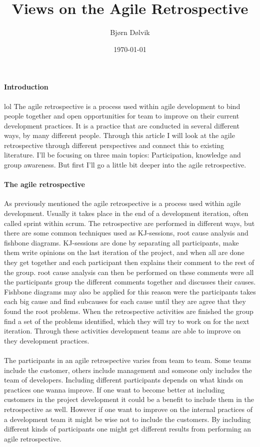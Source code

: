 \documentclass{article}
\begin{document}
\title{Views on the Agile Retrospective}
\date{\today{}}
\author{Bjørn Dølvik}

\maketitle

\paragraph{Introduction}
lol
The agile retrospective is a process used within agile development to bind people together and open opportunities for team to improve on their current development practices. It is a practice that are conducted in several different ways, by many different people. Through this article I will look at the agile retrospective through different perspectives and connect this to existing literature. I'll be focusing on three main topics: Participation, knowledge and group awareness. But first I'll go a little bit deeper into the agile retrospective.

\paragraph{The agile retrospective}
As previously mentioned the agile retrospective is a process used within agile development. Usually it takes place in the end of a development iteration, often called sprint within scrum. The retrospective are performed in different ways, but there are some common techniques used as KJ-sessions, root cause analysis and fishbone diagrams. KJ-sessions are done by separating all participants, make them write opinions on the last iteration of the project, and when all are done they get together and each participant then explains their comment to the rest of the group. root cause analysis can then be performed on these comments were all the participants group the different comments together and discusses their causes. Fishbone diagrams may also be applied for this reason were the participants takes each big cause and find subcauses for each cause until they are agree that they found the root problems. When the retrospective activities are finished the group find a set of the problems identified, which they will try to work on for the next iteration. Through these activities development teams are able to improve on they development practices. 

\paragraph{}
The participants in an agile retrospective varies from team to team. Some teams include the customer, others include management and someone only includes the team of developers. Including different participants depends on what kinds on practices one wanna improve. If one want to become better at including customers in the project development it could be a benefit to include them in the retrospective as well. However if one want to improve on the internal practices of a development team it might be wise not to include the customers. By including different kinds of participants one might get different results from performing an agile retrospective. 
\end{document}

